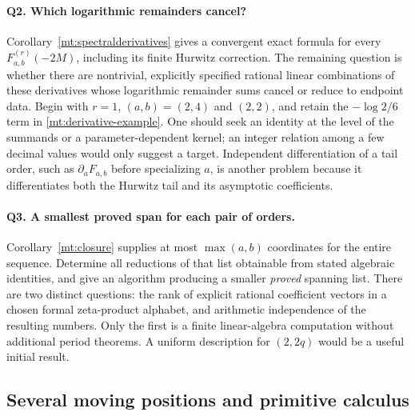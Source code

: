 \documentclass[11pt,letterpaper]{article}
\numberwithin{equation}{section}
\theoremstyle{plain}
\theoremstyle{definition}
\theoremstyle{remark}
\begin{document}
\paragraph{Q2. Which logarithmic remainders cancel?}
Corollary~\ref{mt:spectralderivatives} gives a convergent exact formula
for every $F_{a,b}^{(r)}(-2M)$, including its finite Hurwitz correction.
The remaining question is whether there are nontrivial, explicitly
specified rational linear combinations of these derivatives whose
logarithmic remainder sums cancel or reduce to endpoint data.
Begin with $r=1$, $(a,b)=(2,4)$ and $(2,2)$, and retain the
$-\log2/6$ term in \eqref{mt:derivative-example}.
One should seek an identity at the level of the summands or a
parameter-dependent kernel; an integer relation among a few decimal
values would only suggest a target. Independent differentiation of a
tail order, such as $\partial_a F_{a,b}$ before specializing $a$,
is another problem because it differentiates both the Hurwitz tail and
its asymptotic coefficients.

\paragraph{Q3. A smallest proved span for each pair of orders.}
Corollary~\ref{mt:closure} supplies at most $\max(a,b)$ coordinates for
the entire sequence. Determine all reductions of that list obtainable
from stated algebraic identities, and give an algorithm producing a
smaller \emph{proved} spanning list. There are two distinct questions:
the rank of explicit rational coefficient vectors in a chosen formal
zeta-product alphabet, and arithmetic independence of the resulting
numbers. Only the first is a finite linear-algebra computation without
additional period theorems. A uniform description for $(2,2q)$ would
be a useful initial result.

\subsection{Several moving positions and primitive calculus}
\end{document}
